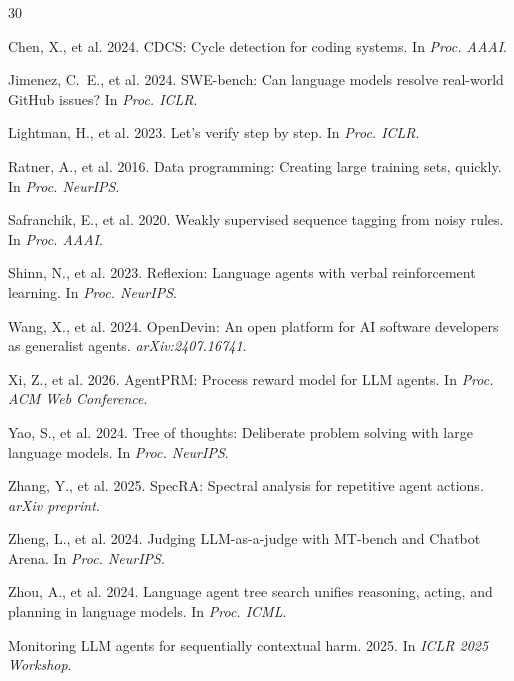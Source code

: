 \documentclass[11pt,a4paper]{article}
\begin{document}
\begin{thebibliography}{30}

Chen, X., et al. 2024.
CDCS: Cycle detection for coding systems.
In \emph{Proc. AAAI}.

Jimenez, C.~E., et al. 2024.
SWE-bench: Can language models resolve real-world GitHub issues?
In \emph{Proc. ICLR}.

Lightman, H., et al. 2023.
Let's verify step by step.
In \emph{Proc. ICLR}.

Ratner, A., et al. 2016.
Data programming: Creating large training sets, quickly.
In \emph{Proc. NeurIPS}.

Safranchik, E., et al. 2020.
Weakly supervised sequence tagging from noisy rules.
In \emph{Proc. AAAI}.

Shinn, N., et al. 2023.
Reflexion: Language agents with verbal reinforcement learning.
In \emph{Proc. NeurIPS}.

Wang, X., et al. 2024.
OpenDevin: An open platform for AI software developers as generalist agents.
\emph{arXiv:2407.16741}.

Xi, Z., et al. 2026.
AgentPRM: Process reward model for LLM agents.
In \emph{Proc. ACM Web Conference}.

Yao, S., et al. 2024.
Tree of thoughts: Deliberate problem solving with large language models.
In \emph{Proc. NeurIPS}.

Zhang, Y., et al. 2025.
SpecRA: Spectral analysis for repetitive agent actions.
\emph{arXiv preprint}.

Zheng, L., et al. 2024.
Judging LLM-as-a-judge with MT-bench and Chatbot Arena.
In \emph{Proc. NeurIPS}.

Zhou, A., et al. 2024.
Language agent tree search unifies reasoning, acting, and planning in language models.
In \emph{Proc. ICML}.

Monitoring LLM agents for sequentially contextual harm.
2025.
In \emph{ICLR 2025 Workshop}.


\end{thebibliography}
\end{document}
